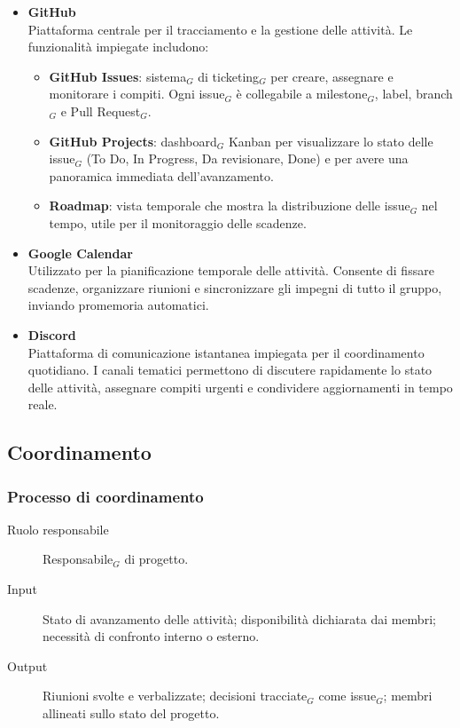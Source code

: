 \documentclass[a4paper, 10pt]{article}
\begin{document}
\begin{itemize}
    \item \textbf{GitHub}\\
    Piattaforma centrale per il tracciamento e la gestione delle attività. Le funzionalità impiegate includono:
    \begin{itemize}
        \item \textbf{GitHub Issues}: sistema$_G$ di ticketing$_G$ per creare, assegnare e monitorare i compiti. Ogni issue$_G$ è collegabile a milestone$_G$, label, branch$_G$ e Pull Request$_G$.
        \item \textbf{GitHub Projects}: dashboard$_G$ Kanban per visualizzare lo stato delle issue$_G$ (To Do, In Progress, Da revisionare, Done) e per avere una panoramica immediata dell'avanzamento.
        \item \textbf{Roadmap}: vista temporale che mostra la distribuzione delle issue$_G$ nel tempo, utile per il monitoraggio delle scadenze.
    \end{itemize}

    \item \textbf{Google Calendar}\\
    Utilizzato per la pianificazione temporale delle attività. Consente di fissare scadenze, organizzare riunioni e sincronizzare gli impegni di tutto il gruppo, inviando promemoria automatici.

    \item \textbf{Discord}\\
    Piattaforma di comunicazione istantanea impiegata per il coordinamento quotidiano. I canali tematici permettono di discutere rapidamente lo stato delle attività, assegnare compiti urgenti e condividere aggiornamenti in tempo reale.
\end{itemize}

\subsection{Coordinamento}
\label{subsec:coordinamento}

\subsubsection{Processo di coordinamento}
\label{subsubsec:processo_coordinamento}

\begin{description}
    \item[Ruolo responsabile] Responsabile$_G$ di progetto.
    \item[Input] Stato di avanzamento delle attività; disponibilità dichiarata dai membri; necessità di confronto interno o esterno.
    \item[Output] Riunioni svolte e verbalizzate; decisioni tracciate$_G$ come issue$_G$; membri allineati sullo stato del progetto.
\end{description}
\end{document}
